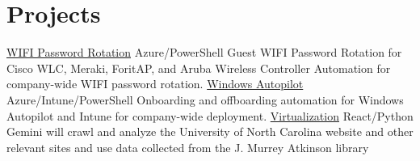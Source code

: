 \section{Projects}
\resumeSubHeadingListStart
    \resumeProjectHeading
    {\href{https://github.com/MurtadhaM/Infrastructure/}{ WIFI Password Rotation} { \faGithub}}{}
    {Azure/PowerShell}
        { Guest WIFI Password Rotation for Cisco WLC, Meraki, ForitAP, and Aruba Wireless Controller Automation for company-wide WIFI password rotation.}
            \resumeProjectHeading
            {\href{https://github.com/MurtadhaM/Infrastructure/Automation/WindowsAutopilot}{  Windows Autopilot} { \faGithub}}{}
            {Azure/Intune/PowerShell}
        {Onboarding and offboarding automation for Windows Autopilot and Intune for company-wide deployment.}
    \resumeProjectHeading
        {\href{https://github.com/MurtadhaM/Virtualization}{  Virtualization}{ \faGithub}}{}
        {React/Python}
        {Gemini will crawl and analyze the University of North Carolina website and other relevant sites and use data collected from the J. Murrey Atkinson library}
\resumeSubHeadingListEnd
